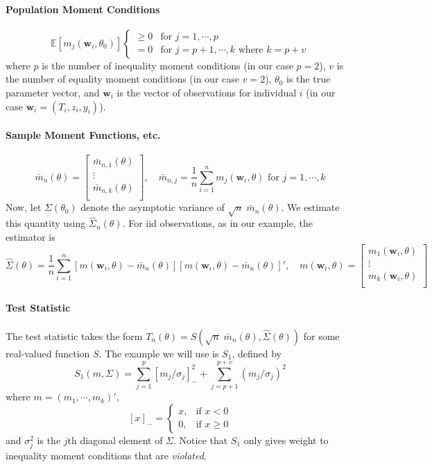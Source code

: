 \documentclass[12pt]{article}
\begin{document}
\paragraph{Population Moment Conditions}
\[
  \mathbb{E} \left[ m_j(\mathbf{w}_i,\theta_0) \right]
  \left\{
  \begin{array}{cc}
    \geq 0 & \mbox{for } j = 1, \cdots, p\\
    = 0 & \mbox{for } j = p + 1, \cdots,k \mbox{ where } k = p + v
  \end{array}
  \right.
\]
where $p$ is the number of inequality moment conditions (in our case $p = 2$), $v$ is the number of equality moment conditions (in our case $v = 2$), $\theta_0$ is the true parameter vector, and $\mathbf{w}_i$ is the vector of observations for individual $i$ (in our case $\mathbf{w}_i = (T_i, z_i, y_i)$).

\paragraph{Sample Moment Functions, etc.}
\[
  \bar{m}_n(\theta) = \left[
  \begin{array}{c}
    \bar{m}_{n,1}(\theta)\\
    \vdots \\
    \bar{m}_{n,k}(\theta)\\
  \end{array}
\right], \quad
\bar{m}_{n,j} = \frac{1}{n} \sum_{i=1}^{n} m_j(\mathbf{w}_i, \theta) \mbox{ for } j = 1, \cdots, k
\]
Now, let $\Sigma(\theta_0)$ denote the asymptotic variance of $\sqrt{n}\; \bar{m}_n(\theta)$.
We estimate this quantity using $\widehat{\Sigma}_n(\theta)$.
For iid observations, as in our example, the estimator is
\[
  \widehat{\Sigma}(\theta) = \frac{1}{n} \sum_{i=1}^n \left[ m(\mathbf{w}_i, \theta) - \bar{m}_n(\theta) \right]\left[ m(\mathbf{w}_i, \theta) - \bar{m}_n(\theta) \right]', \quad 
  m(\mathbf{w}_i, \theta) = \left[
  \begin{array}{c}
    m_1(\mathbf{w}_i, \theta)\\
    \vdots \\
    m_k(\mathbf{w}_i, \theta)\\
  \end{array}
\right]
\]

\paragraph{Test Statistic}
The test statistic takes the form $T_n(\theta) = S\left( \sqrt{n}\; \bar{m}_n(\theta), \widehat{\Sigma}(\theta) \right)$ for some real-valued function $S$.
The example we will use is $S_1$, defined by
\[
  S_1(m, \Sigma) = \sum_{j=1}^p [m_j/\sigma_j]^2_- + \sum_{j=p+1}^{p+v} (m_j/\sigma_j)^2
\]
where $m = (m_1, \cdots, m_k)'$,
\[
  [x]_- = \left\{
  \begin{array}{cc}
    x, & \mbox{if } x <0\\
    0, & \mbox{if } x \geq 0
  \end{array}
\right.
\]
and $\sigma_j^2$ is the $j$th diagonal element of $\Sigma$.
Notice that $S_1$ only gives weight to inequality moment conditions that are \emph{violated}.
\end{document}
